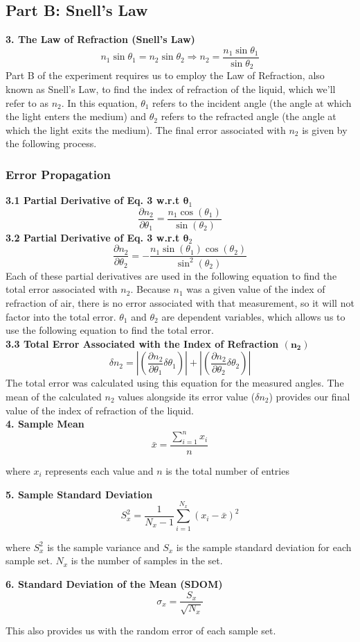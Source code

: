 \documentclass[12pt]{article}
\begin{document}
\subsection*{Part B: Snell's Law}
\noindent\textbf{3. The Law of Refraction (Snell's Law)}\[n_1\sin{\theta_1}=n_2\sin{\theta_2}\Rightarrow n_2=\frac{n_1\sin\theta_1}{\sin\theta_2}\]
    Part B of the experiment requires us to employ the Law of Refraction, also known as Snell's Law, to find the index of refraction of the liquid, which we'll refer to as $n_2$. In this equation, $\theta_1$ refers to the incident angle (the angle at which the light enters the medium) and $\theta_2$ refers to the refracted angle (the angle at which the light exits the medium). The final error associated with $n_2$ is given by the following process. 
\subsubsection*{Error Propagation}
\noindent\textbf{3.1 Partial Derivative of Eq. 3 w.r.t $\bm \theta_1$}\[\frac{\partial n_2}{\partial\theta_1}=\dfrac{n_1\cos\left({\theta}_1\right)}{\sin\left({\theta}_2\right)}\]
\textbf{3.2 Partial Derivative of Eq. 3 w.r.t $\bm \theta_2$}\[\frac{\partial n_2}{\partial\theta_2}=-\dfrac{n_1\sin\left({\theta}_1\right)\cos\left({\theta}_2\right)}{\sin^2\left({\theta}_2\right)}\]
    Each of these partial derivatives are used in the following equation to find the total error associated with $n_2$. Because $n_1$ was a given value of the index of refraction of air, there is no error associated with that measurement, so it will not factor into the total error. $\theta_1$ and $\theta_2$ are dependent variables, which allows us to use the following equation to find the total error.\\
\textbf{3.3 Total Error Associated with the Index of Refraction $\bm{({n_{2}})}$}\[\delta n_2= \left|\left(\frac{\partial n_2}{\partial \theta_1}\delta\theta_1\right)\right|+\left|\left(\frac{\partial n_2}{\partial \theta_2}\delta\theta_2\right)\right|\] 
    The total error was calculated using this equation for the measured angles. The mean of the calculated $n_2$ values alongside its error value ($\delta n_2$) provides our final value of the index of refraction of the liquid.\\
\textbf{4. Sample Mean}\[\bar{x}=\frac{\sum\limits^{n}_{i=1}{x_i}}{n}\]
    \begin{center}
        where \(x_i\) represents each value and \(n\) is the total number of entries
    \end{center}
\textbf{5. Sample Standard Deviation}\[S_x^2=\frac{1}{N_x-1}\sum^{N_x}_{i=1}(x_i-\bar{x})^2 \]
    \begin{center}
        where \(S_x^2\) is the sample variance and \(S_x\) is the sample standard deviation for each sample set. \(N_x\) is the number of samples in the set. \\
    \end{center}
\textbf{6. Standard Deviation of the Mean (SDOM)}\[\sigma_x=\frac{S_x}{\sqrt{N_x}}\]
    \begin{center}
        This also provides us with the random error of each sample set.\\
    \end{center}
\newpage
\end{document}
